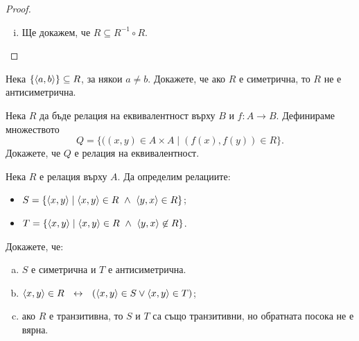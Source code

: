 \begin{proof}
\begin{enumerate}[a)]
\begin{enumerate}[(i)]
      \begin{prooftree}
      \end{prooftree}
    \item
      Ще докажем, че $R \subseteq R^{-1}\circ R$.
      \begin{prooftree}
      \end{prooftree}
    \end{enumerate}
  \end{enumerate}
  
\end{proof}

\begin{problem}
  Нека $\{\pair{a,b}\}\subseteq R$, за някои $a\neq b$.
  Докажете, че ако $R$ е симетрична, то $R$ не е антисиметрична.
\end{problem}

\begin{problem}
  Нека $R$ да бъде релация на еквивалентност върху $B$ и $f:A\to B$.
  Дефинираме множеството 
  \[Q = \{((x,y)\in A\times A\mid (f(x),f(y))\in R\}.\]
  Докажете, че $Q$ е релация на еквивалентност.
\end{problem}

\begin{problem}
  Нека $R$ е релация върху $A$.
  Да определим релациите:
  \begin{itemize}
  \item 
    $S = \{\pair{x,y}\mid \pair{x,y} \in R\ \wedge\ \pair{y,x} \in R\}$;
  \item
    $T = \{\pair{x,y} \mid \pair{x,y}\in R\ \wedge\ \pair{y,x}\not\in R\}$.
  \end{itemize}
  Докажете, че:
  \begin{enumerate}[a)]
  \item 
    $S$ е симетрична и $T$ е антисиметрична.
  \item
    $\pair{x,y} \in R\ \iff\ (\pair{x,y}\in S \vee \pair{x,y} \in T)$;
  \item
    ако $R$ е транзитивна, то $S$ и $T$ са също транзитивни, но обратната посока не е вярна.
  \end{enumerate}
\end{problem}

